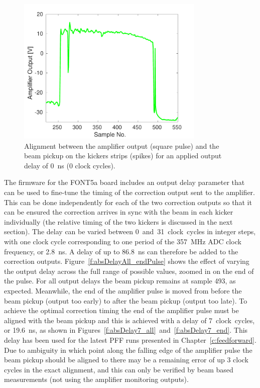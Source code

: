 \begin{figure}
  \centering
  \includegraphics[width=0.8\textwidth]{Figures/commissioning/absDelay0_all}
  \caption{Alignment between the amplifier output (square pulse) and the beam pickup on the kickers strips (spikes) for an applied output delay of 0~ns (0 clock cycles).}
  \label{f:absDelay0_all}
\end{figure}

The firmware for the FONT5a board includes an output delay parameter that can be used to fine-tune the timing of the correction output sent to the amplifier. This can be done independently for each of the two correction outputs so that it can be ensured the correction arrives in sync with the beam in each kicker individually (the relative timing of the two kickers is discussed in the next section). The delay can be varied between 0~and~31~clock~cycles in integer steps, with one clock cycle corresponding to one period of the 357~MHz ADC clock frequency, or 2.8~ns. A delay of up to 86.8~ns can therefore be added to the correction outputs. Figure~\ref{f:absDelayAll_endPulse} shows the effect of varying the output delay across the full range of possible values, zoomed in on the end of the pulse. For all output delays the beam pickup remains at sample 493, as expected. Meanwhile, the end of the amplifier pulse is moved from before the beam pickup (output too early) to after the beam pickup (output too late). To achieve the optimal correction timing the end of the amplifier pulse must be aligned with the beam pickup and this is achieved with a delay of 7~clock~cycles, or 19.6~ns, as shown in Figures~\ref{f:absDelay7_all}~and~\ref{f:absDelay7_end}. This delay has been used for the latest PFF runs presented in Chapter~\ref{c:feedforward}. Due to ambiguity in which point along the falling edge of the amplifier pulse the beam pickup should be aligned to there may be a remaining error of up 3 clock cycles in the exact alignment, and this can only be verified by beam based measurements (not using the amplifier monitoring outputs). 


